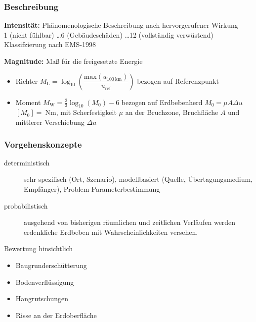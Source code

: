 \begin{frame}
\frametitle{Beschreibung}
\textbf{Intensität:} Phänomenologische Beschreibung nach hervorgerufener Wirkung\\
1 (nicht fühlbar) \dots 6 (Gebäudeschäden) \dots 12 (vollständig verwüstend) Klassifzierung nach EMS-1998

\bigskip

\textbf{Magnitude:} Maß für die freigesetzte Energie
\begin{itemize}
 \item Richter $M_\mathrm{L} = \log_{10}\left(\dfrac{\mathrm{max}(u_{\SI{100}{\kilo\metre}})}{u_\mathrm{ref}} \right)$ bezogen auf Referenzpunkt  %
 \item Moment  $M_\mathrm{W}=\frac{2}{3}\log_{10}(M_0) - 6$  bezogen auf Erdbebenherd $M_0 = \mu A \Delta u$ $[M_0]=\SI{}{\newton\metre}$, mit Scherfestigkeit $\mu$ an der Bruchzone, Bruchfläche $A$ und mittlerer Verschiebung $\Delta u$  %
\end{itemize}
\end{frame}


\begin{frame}
\frametitle{Vorgehenskonzepte}
\begin{description}
 \item[deterministisch] sehr spezifisch (Ort, Szenario), modellbasiert (Quelle, Übertagungsmedium, Empfänger), Problem Parameterbestimmung
 
 \item[probabilistisch] ausgehend von bisherigen räumlichen und zeitlichen Verläufen werden erdenkliche Erdbeben mit Wahrscheinlichkeiten versehen.
\end{description}

\vfill

Bewertung hinsichtlich
\begin{itemize}
 \item Baugrunderschütterung
 \item Bodenverflüssigung
 \item Hangrutschungen
 \item Risse an der Erdoberfläche
\end{itemize}


\end{frame}


